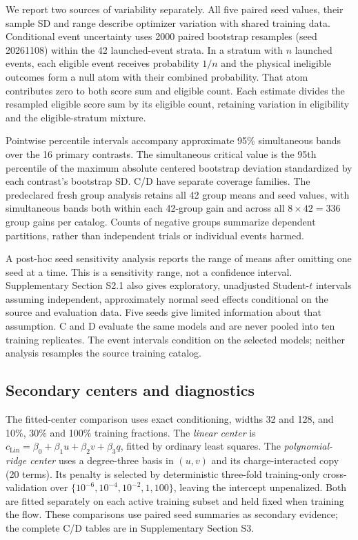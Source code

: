 \documentclass[twocolumn,epjc3]{svjour3}
\newcommand{\simple}{\mathrm{Lin}}
\begin{document}
We report two sources of variability separately. All five paired seed values,
their sample SD and range describe optimizer variation with shared training
data. Conditional event uncertainty uses 2000 paired bootstrap resamples
(seed 20261108) within the 42 launched-event strata. In a stratum with $n$
launched events, each eligible event receives probability $1/n$ and the
physical ineligible outcomes form a null atom with their combined probability.
That atom contributes zero to both score sum and eligible count. Each estimate
divides the resampled eligible score sum by its eligible count, retaining
variation in eligibility and the eligible-stratum mixture.

Pointwise percentile intervals accompany approximate 95\% simultaneous bands
over the 16 primary contrasts. The simultaneous critical value is the 95th
percentile of the maximum absolute centered bootstrap deviation standardized
by each contrast's bootstrap SD. C/D have separate coverage families.
The predeclared fresh group analysis retains all 42 group means and seed
values, with simultaneous bands both within each 42-group gain and across
all $8\times42=336$ group gains per catalog. Counts of negative groups
summarize dependent partitions, rather than independent trials or individual
events harmed.

A post-hoc seed sensitivity analysis reports the range of means after omitting
one seed at a time. This is a sensitivity range, not a confidence interval.
Supplementary Section S2.1 also gives exploratory, unadjusted Student-$t$
intervals assuming independent, approximately normal seed effects conditional
on the source and evaluation data. Five seeds give limited information about
that assumption. C and D evaluate the same models and are never pooled into
ten training replicates. The event intervals condition on the selected models;
neither analysis resamples the source training catalog.

\subsection{Secondary centers and diagnostics}

The fitted-center comparison uses exact conditioning, widths 32 and 128, and
10\%, 30\% and 100\% training fractions. The \emph{linear center} is
$c_{\simple}=\beta_0+\beta_1u+\beta_2v+\beta_3q$, fitted by ordinary least
squares. The \emph{polynomial-ridge center} uses a degree-three basis in
$(u,v)$ and its charge-interacted copy (20 terms). Its penalty is selected
by deterministic three-fold training-only cross-validation over
$\{10^{-6},10^{-4},10^{-2},1,100\}$, leaving the intercept unpenalized.
Both are fitted separately on each active training subset and held fixed
when training the flow. These comparisons use paired seed summaries as
secondary evidence; the complete C/D tables are in Supplementary Section S3.
\end{document}
